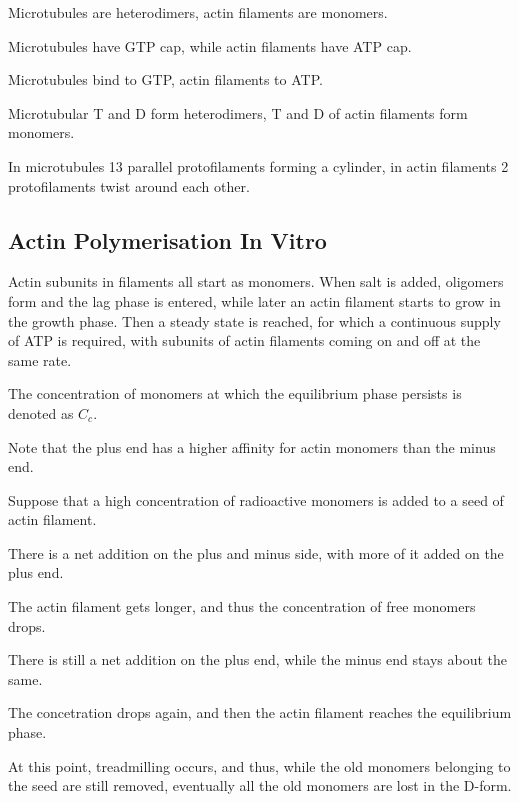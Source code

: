 \documentclass[11pt]{scrartcl}
\begin{document}
Microtubules are heterodimers, actin filaments are monomers.

Microtubules have GTP cap, while actin filaments have ATP cap.

Microtubules bind to GTP, actin filaments to ATP.

Microtubular T and D form heterodimers, T and D of actin filaments form monomers.

In microtubules 13 parallel protofilaments forming a cylinder, in
actin filaments 2 protofilaments twist around each other.

\subsection{Actin Polymerisation In Vitro}

Actin subunits in filaments all start as monomers. When salt is added,
oligomers form and the lag phase is entered, while later an actin
filament starts to grow in the growth phase. Then a steady state is
reached, for which a continuous supply of ATP is required, with
subunits of actin filaments coming on and off at the same rate.

The concentration of monomers at which the equilibrium phase persists
is denoted as $C_c$.

Note that the plus end has a higher affinity for actin monomers than the minus end.

Suppose that a high concentration of radioactive monomers is added to a seed of actin filament.

There is a net addition on the plus and minus side, with more of it added on the plus end. 

The actin filament gets longer, and thus the concentration of free
monomers drops.

There is still a net addition on the plus end, while the minus end
stays about the same.

The concetration drops again, and then the actin filament reaches the
equilibrium phase.

At this point, treadmilling occurs, and thus, while the old monomers
belonging to the seed are still removed, eventually all the old
monomers are lost in the D-form.


\end{document}
